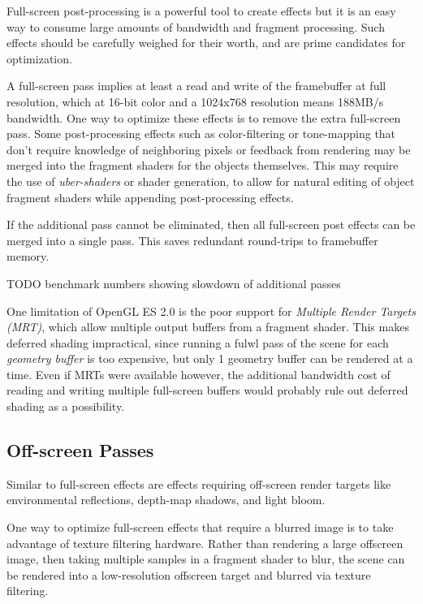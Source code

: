 Full-screen post-processing is a powerful tool to create effects but it is an
easy way to consume large amounts of bandwidth and fragment processing.  Such
effects should be carefully weighed for their worth, and are prime candidates
for optimization.  

A full-screen pass implies at least a read and write of the framebuffer at full
resolution, which at 16-bit color and a 1024x768 resolution means 188MB/s
bandwidth.  One way to optimize these effects is to remove the extra
full-screen pass.  Some post-processing effects such as color-filtering or
tone-mapping that don't require knowledge of neighboring pixels or feedback
from rendering may be merged into the fragment shaders for the objects
themselves.  This may require the use of \textit{uber-shaders} or shader
generation, to allow for natural editing of object fragment shaders while
appending post-processing effects.

If the additional pass cannot be eliminated, then all full-screen post effects can be merged into a single pass.  This saves redundant round-trips to framebuffer memory.

TODO benchmark numbers showing slowdown of additional passes


One limitation of OpenGL ES 2.0 is the poor support for \textit{Multiple Render
Targets (MRT)}, which allow multiple output buffers from a fragment shader.
This makes deferred shading impractical, since running a fulwl pass of the scene
for each \textit{geometry buffer} is too expensive, but only 1 geometry buffer
can be rendered at a time.  Even if MRTs were available however, the additional
bandwidth cost of reading and writing multiple full-screen buffers would
probably rule out deferred shading as a possibility.

\subsection{Off-screen Passes}\label{Jon-McCaffrey-Off-Screen-Pass}


Similar to full-screen effects are effects requiring off-screen render targets like environmental reflections, depth-map shadows, and light bloom.

One way to optimize full-screen effects that require a blurred image is to take
advantage of texture filtering hardware.  Rather than rendering a large
offscreen image, then taking multiple samples in a fragment shader to blur, the
scene can be rendered into a low-resolution offscreen target and blurred via texture filtering.

